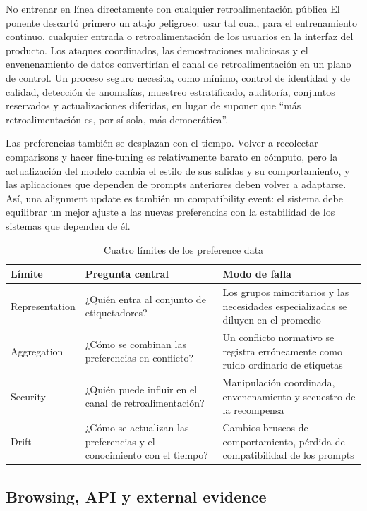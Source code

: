 \documentclass[a4paper]{article}
\begin{document}
\begin{importantbox}{No entrenar en línea directamente con cualquier retroalimentación pública}
El ponente descartó primero un atajo peligroso: usar tal cual, para el entrenamiento continuo, cualquier entrada o retroalimentación de los usuarios en la interfaz del producto. Los ataques coordinados, las demostraciones maliciosas y el envenenamiento de datos convertirían el canal de retroalimentación en un plano de control. Un proceso seguro necesita, como mínimo, control de identidad y de calidad, detección de anomalías, muestreo estratificado, auditoría, conjuntos reservados y actualizaciones diferidas, en lugar de suponer que ``más retroalimentación es, por sí sola, más democrática''.
\end{importantbox}

Las preferencias también se desplazan con el tiempo. Volver a recolectar comparisons y hacer fine-tuning es relativamente barato en cómputo, pero la actualización del modelo cambia el estilo de sus salidas y su comportamiento, y las aplicaciones que dependen de prompts anteriores deben volver a adaptarse. Así, una alignment update es también un compatibility event: el sistema debe equilibrar un mejor ajuste a las nuevas preferencias con la estabilidad de los sistemas que dependen de él.

\begin{table}[H]
\centering
\caption{Cuatro límites de los preference data}
\begin{tabularx}{\textwidth}{L{2.5cm} X X}
\toprule
Límite & Pregunta central & Modo de falla \\
\midrule
Representation & ¿Quién entra al conjunto de etiquetadores? & Los grupos minoritarios y las necesidades especializadas se diluyen en el promedio \\
Aggregation & ¿Cómo se combinan las preferencias en conflicto? & Un conflicto normativo se registra erróneamente como ruido ordinario de etiquetas \\
Security & ¿Quién puede influir en el canal de retroalimentación? & Manipulación coordinada, envenenamiento y secuestro de la recompensa \\
Drift & ¿Cómo se actualizan las preferencias y el conocimiento con el tiempo? & Cambios bruscos de comportamiento, pérdida de compatibilidad de los prompts \\
\bottomrule
\end{tabularx}
\end{table}

\subsection{Browsing, API y external evidence}
\end{document}
